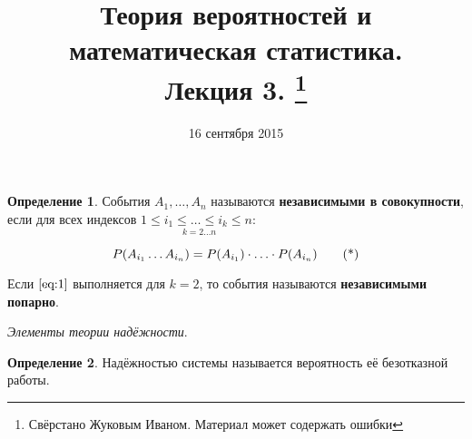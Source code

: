 \documentclass[a4paper, 12pt]{article}
\title{Теория вероятностей и математическая статистика.\\Лекция 3.
    \footnote{Свёрстано Жуковым Иваном. Материал может содержать ошибки}}
\author{}
\date{16 сентября 2015}
\theoremstyle{definition}
\newtheorem{Definition}{Определение}
\begin{document}
    \maketitle{}

    \begin{Definition}
        События \(A_1, \dots, A_n\) называются \textbf{независимыми в совокупности}, если для всех индексов
        \( \underset{k = 2 \ldots n}{ 1 \le i_1 \le \ldots \le i_k \le n:}\)

        \begin{equation}{\label{eq:1}}
            P(A_{i_1} \dots A_{i_n}) = P(A_{i_1}) \cdot \ldots \cdot P(A_{i_n}) \tag{*}
        \end{equation}

        Если \(\eqref{eq:1}\) выполняется для \(k = 2\), то события называются \textbf{независимыми попарно}.
    \end{Definition}

    \begin{center}
        \textit{Элементы теории надёжности}.
    \end{center}

    \begin{Definition}
        Надёжностью системы называется вероятность её безотказной работы.
    \end{Definition}
\end{document}
